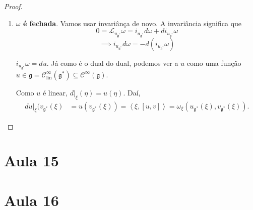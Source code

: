 \begin{proof}
\begin{enumerate}[label=\textbf{Paso \arabic*}]
\item \textbf{$\omega$ é fechada}. Vamos usar invariânça de novo. A invariância significa que
	\[0=\mathcal{L}_{u_{\mathfrak{g}^*}}\omega=i_{u_{\mathfrak{g}^*}}d\omega +di_{u_{\mathfrak{g}^*}}\omega\]
	\[\implies i_{u_{\mathfrak{g}^*}}d\omega =-d(i_{u_{\mathfrak{g}^*}}\omega )\]
	\begin{claim}
		$i_{u_{\mathfrak{g}^*}}\omega =du$. Já como é o dual do dual, podemos ver a $u$ como uma função $u\in\mathfrak{g} =\mathcal{C}^\infty_{\operatorname{lin}}(\mathfrak{g}^*)\subseteq \mathcal{C}^\infty(\mathfrak{g})$.
	\end{claim}
	Como $u$ é linear, $d|_{\xi}(\eta)=u(\eta)$. Daí,
	\begin{align*}
		du|_{\xi}(v_{\mathfrak{g}^*}(\xi )&=u(v_{\mathfrak{g}^*}(\xi ))=\left<\xi,[u,v]\right> =\omega_{\xi}(u_{\mathfrak{g}^*}(\xi ),v_{\mathfrak{g}^*}(\xi )).
	\end{align*}
	\end{enumerate}
\end{proof}
















\section{Aula 15}

\section{Aula 16}



